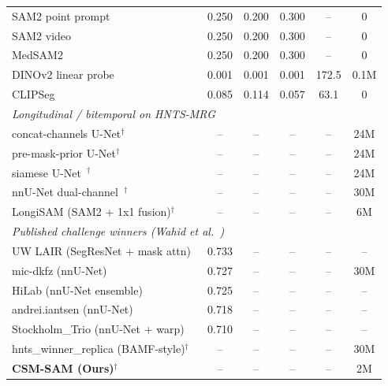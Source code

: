 \begin{table}[t]
{\begin{tabular}{lccccc}
SAM2 point prompt~\cite{ravi2024sam2}              & 0.250 & 0.200 & 0.300 & --    & 0 \\
SAM2 video~\cite{ravi2024sam2}                     & 0.250 & 0.200 & 0.300 & --    & 0 \\
MedSAM2~\cite{ma2024medsam2}                       & 0.250 & 0.200 & 0.300 & --    & 0 \\
DINOv2 linear probe~\cite{oquab2024dinov2}         & 0.001 & 0.001 & 0.001 & 172.5 & 0.1M \\
CLIPSeg~\cite{lueddecke2022clipseg}                & 0.085 & 0.114 & 0.057 & 63.1  & 0 \\
\midrule
\multicolumn{6}{l}{\emph{Longitudinal / bitemporal on HNTS-MRG}} \\
concat-channels U-Net$^\dagger$                                  & -- & -- & -- & --    & 24M \\
pre-mask-prior U-Net$^\dagger$                                   & -- & -- & -- & --    & 24M \\
siamese U-Net~\cite{daudt2018fcsiam}$^\dagger$                   & -- & -- & -- & --    & 24M \\
nnU-Net dual-channel~\cite{isensee2021nnunet}$^\dagger$          & -- & -- & -- & --    & 30M \\
LongiSAM (SAM2 + 1x1 fusion)$^\dagger$                           & -- & -- & -- & --    & 6M  \\
\midrule
\multicolumn{6}{l}{\emph{Published challenge winners (Wahid et al.~\cite{wahid2024hntsmrg})}} \\
UW LAIR (SegResNet + mask attn)~\cite{wahid2024hntsmrg} & 0.733 & -- & -- & -- & -- \\
mic-dkfz (nnU-Net)~\cite{isensee2021nnunet}            & 0.727 & -- & -- & -- & 30M \\
HiLab (nnU-Net ensemble)~\cite{isensee2021nnunet}      & 0.725 & -- & -- & -- & -- \\
andrei.iantsen (nnU-Net)~\cite{isensee2021nnunet}      & 0.718 & -- & -- & -- & -- \\
Stockholm\_Trio (nnU-Net + warp)~\cite{isensee2021nnunet} & 0.710 & -- & -- & -- & -- \\
hnts\_winner\_replica (BAMF-style)$^\dagger$~\cite{wahid2024hntsmrg} & -- & -- & -- & -- & 30M \\
\midrule
\textbf{CSM-SAM (Ours)}$^\dagger$                       & --    & --    & --    & --    & 2M \\ %
\bottomrule
\end{tabular}%
}
\end{table}
